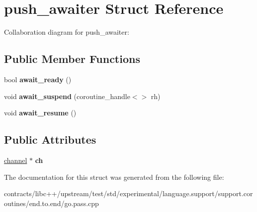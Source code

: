 \hypertarget{structpush__awaiter}{}\section{push\+\_\+awaiter Struct Reference}
\label{structpush__awaiter}


Collaboration diagram for push\+\_\+awaiter\+:
\subsection*{Public Member Functions}
\begin{DoxyCompactItemize}
\item 
\mbox{\label{structpush__awaiter_ab9f50fecc5c776c801350f6540105c67}} 
bool {\bfseries await\+\_\+ready} ()
\item 
\mbox{\label{structpush__awaiter_a3df9df59ea41920cc2fd6711d72aaf78}} 
void {\bfseries await\+\_\+suspend} (coroutine\+\_\+handle$<$$>$ rh)
\item 
\mbox{\label{structpush__awaiter_a4cd8e91ea3d11f6664e365082e2d34b9}} 
void {\bfseries await\+\_\+resume} ()
\end{DoxyCompactItemize}
\subsection*{Public Attributes}
\begin{DoxyCompactItemize}
\item 
\mbox{\label{structpush__awaiter_aa7fbdd3cda529e5ae75c1e64bd728b28}} 
\mbox{\hyperlink{classchannel}{channel}} $\ast$ {\bfseries ch}
\end{DoxyCompactItemize}


The documentation for this struct was generated from the following file\+:\begin{DoxyCompactItemize}
\item 
contracts/libc++/upstream/test/std/experimental/language.\+support/support.\+coroutines/end.\+to.\+end/go.\+pass.\+cpp\end{DoxyCompactItemize}
